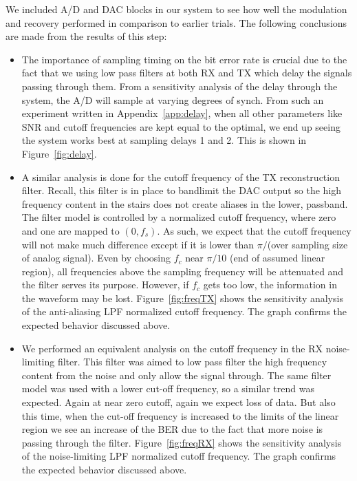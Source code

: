\documentclass[]{article}
\begin{document}
We included A/D and DAC blocks in our system to see how well the modulation and recovery performed in comparison to earlier trials. The following conclusions are made from the results of this step:

\begin{itemize}
\item The importance of sampling timing on the bit error rate is crucial due to the fact that we using low pass filters at both RX and TX  which delay the signals passing through them. From a sensitivity analysis of the delay through the system, the A/D will sample at varying degrees of synch. From such an experiment written in Appendix~\ref{app:delay}, when all other parameters like SNR and cutoff frequencies are kept equal to the optimal, we end up seeing the system works best at sampling delays 1 and 2. This is shown in Figure~\ref{fig:delay}.
\item A similar analysis is done for the cutoff frequency of the TX reconstruction filter. Recall, this filter is in place to bandlimit the DAC output so the high frequency content in the stairs does not create aliases in the lower, passband. The filter model is controlled by a normalized cutoff frequency, where zero and one are mapped to $\left(0,f_s\right)$.  As such, we expect that the cutoff frequency will not make much difference except if it is lower than $\pi/$(over sampling size of analog signal).  Even by choosing $f_c$ near $\pi/10$ (end of assumed linear region), all frequencies above the sampling frequency will be attenuated and the filter serves its purpose.  However, if $f_c$ gets too low, the information in the waveform may be lost. 
Figure~\ref{fig:freqTX} shows the sensitivity analysis of the anti-aliasing LPF normalized cutoff frequency.  The graph confirms the expected behavior discussed above.
\item We performed an equivalent analysis on the cutoff frequency in the RX noise-limiting filter.  This filter was aimed to low pass filter the high frequency content from the noise and only allow the signal through.  The same filter model was used with a lower cut-off frequency, so a similar trend was expected. Again at near zero cutoff, again we expect loss of data. But also this time, when the cut-off frequency is increased to the limits of the linear region we see an increase of the BER due to the fact that more noise is passing through the filter. Figure~\ref{fig:freqRX} shows the sensitivity analysis of the noise-limiting LPF normalized cutoff frequency.  The graph confirms the expected behavior discussed above.
\end{itemize}
\end{document}
